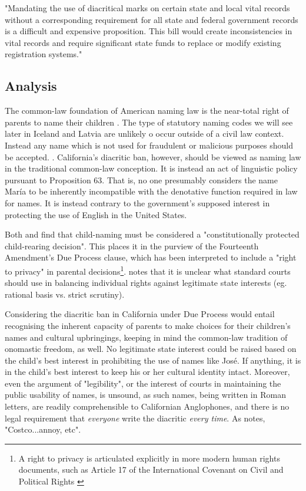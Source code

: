 \begin{aquote}{\parencite{veto}}
	
	"Mandating the use of diacritical marks on certain state and local vital
	records without a corresponding requirement for all state and federal
	government records is a difficult and expensive proposition. This bill would
	create inconsistencies in vital records and require significant state funds
	to replace or modify existing registration systems."

\end{aquote}

\subsection{Analysis}

The common-law foundation of American naming law is the near-total right of
parents to name their children \parencite{heymann11}. The type of statutory
naming codes we will see later in Iceland and Latvia are unlikely o occur
outside of a civil law context. Instead any name which is not used for
fraudulent or malicious purposes should be accepted. \parencite{ferner96}
\parencite{finch08} \parencite{heymann11}. California's diacritic ban, however,
should be viewed as naming law in the traditional common-law conception. It is
instead an act of linguistic policy pursuant to Proposition 63. That is, no one
presumably considers the name María to be inherently incompatible with the
denotative function required in law for names. It is instead contrary to the
government's supposed interest in protecting the use of English in the United
States.

Both \textcite{larson11} and \textcite[598]{foggan83} find that child-naming must
be considered a "constitutionally protected child-rearing decision". This
places it in the purview of the Fourteenth Amendment's Due Process clause,
which has been interpreted to include a "right to privacy" in parental
decisions\footnote{A right to privacy is articulated explicitly in more modern
human rights documents, such as Article 17 of the International Covenant on
Civil and Political Rights \parencite{iccpr}}. \textcite{larson11} notes that
it is unclear what standard courts should use in balancing individual rights
against legitimate state interests (eg. rational basis vs. strict scrutiny).

Considering the diacritic ban in California under Due Process would entail
recognising the inherent capacity of parents to make choices for their
children's names and cultural upbringings, keeping in mind the common-law
tradition of onomastic freedom, as well. No legitimate state interest could be
raised based on the child's best interest in prohibiting the use of names like
José. If anything, it is in the child's best interest to keep his or her
cultural identity intact. Moreover, even the argument of "legibility", or the
interest of courts in maintaining the public usability of names, is unsound, as
such names, being written in Roman letters, are readily comprehensible to
Californian Anglophones, and there is no legal requirement that
\textit{everyone} write the diacritic \textit{every time}. As
\parencite{larson11} notes, "Costco...annoy, etc".

